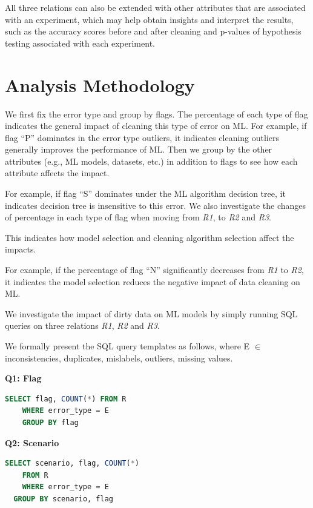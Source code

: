 All three relations can also be extended with other attributes that are associated with an experiment, which may help obtain insights and interpret the results, such as the accuracy scores before and
after cleaning and p-values of hypothesis testing associated with
each experiment.


\section{Analysis Methodology}\label{sec:analysis-methodology}

We first fix the error type and group by flags. The percentage of each type of flag indicates the general impact of cleaning this type of error on ML. For example,
if flag “P” dominates in the error type outliers, it indicates cleaning outliers generally improves the performance of ML. Then we
group by the other attributes (e.g., ML models, datasets, etc.) in addition to flags to see how each attribute affects the impact. 

For example, if flag “S” dominates under the ML algorithm decision tree, it indicates decision tree is insensitive to this error.
We also investigate the changes of percentage in each type of flag when moving from \textit{R1}, to \textit{R2} and \textit{R3}. 

This indicates how model selection and cleaning algorithm selection affect the impacts. 

For example, if the percentage of flag “N” significantly decreases from
\textit{R1} to \textit{R2}, it indicates the model selection reduces the negative impact of data cleaning on ML.

We investigate the impact of dirty data on ML models by simply running SQL queries on three relations \textit{R1}, \textit{R2} and \textit{R3}. 

We formally present the SQL query templates as follows, where E $\in$ {inconsistencies, duplicates, mislabels, outliers, missing values}.

\textbf{Q1: Flag}
\begin{lstlisting}[language=SQL, caption=Q1: Flag]
	SELECT flag, COUNT(*) FROM R 
	WHERE error_type = E 
	GROUP BY flag
\end{lstlisting}

\textbf{Q2: Scenario}
\begin{lstlisting}[language=SQL, caption=Q2: Scenario]
	SELECT scenario, flag, COUNT(*)
	FROM R
	WHERE error_type = E
  GROUP BY scenario, flag
\end{lstlisting}

